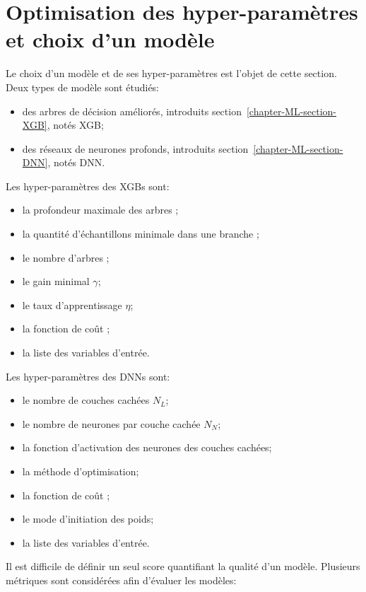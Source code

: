 \section{Optimisation des hyper-paramètres et choix d'un modèle}\label{chapter-ML-section-hyperparameters}
Le choix d'un modèle et de ses hyper-paramètres est l'objet de cette section.
Deux types de modèle sont étudiés:
\begin{itemize}
\item des arbres de décision améliorés, introduits section~\ref{chapter-ML-section-XGB}, notés XGB;
\item des réseaux de neurones profonds, introduits section~\ref{chapter-ML-section-DNN}, notés DNN.
\end{itemize}
\par
Les hyper-paramètres des XGBs sont:
\begin{itemize}
\item la profondeur maximale des arbres \MaxDepth;
\item la quantité d'échantillons minimale dans une branche \MinChildWeight;
\item le nombre d'arbres \Nestimators;
\item le gain minimal $\gamma$;
\item le taux d'apprentissage $\eta$;
\item la fonction de coût \Loss;
\item la liste des variables d'entrée.
\end{itemize}
Les hyper-paramètres des DNNs sont:
\begin{itemize}
\item le nombre de couches cachées $N_L$;
\item le nombre de neurones par couche cachée $N_N$;
\item la fonction d'activation des neurones des couches cachées;
\item la méthode d'optimisation;
\item la fonction de coût \Loss;
\item le mode d'initiation des poids;
\item la liste des variables d'entrée.
\end{itemize}
\par
Il est difficile de définir un seul score quantifiant la qualité d'un modèle.
Plusieurs métriques sont considérées afin d'évaluer les modèles:
